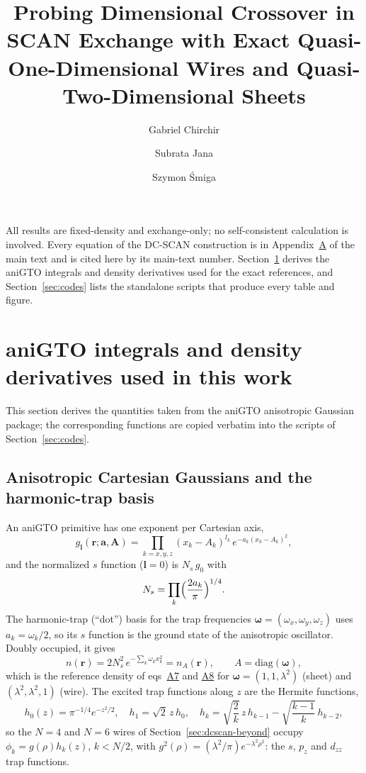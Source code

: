 \documentclass[journal=jctcce,manuscript=suppinfo]{achemso}
\title{Probing Dimensional Crossover in SCAN Exchange with Exact Quasi-One-Dimensional Wires and Quasi-Two-Dimensional Sheets}
\author{Gabriel Chirchir}
\author{Subrata Jana}
\author{Szymon \'Smiga}
\affiliation{Institute of Physics, Faculty of Physics, Astronomy and Informatics,
Nicolaus Copernicus University in Toru\'n, ul.~Grudzi\c{a}dzka~5, 87-100 Toru\'n, Poland}
\begin{document}
All results are fixed-density and exchange-only; no self-consistent
calculation is involved.  Every equation of the DC-SCAN construction is in
Appendix~\href{main.pdf\#section*.6}{A} of the main text and is cited here by its main-text
number.  Section~\ref{sec:anigto-derivation} derives the aniGTO integrals and
density derivatives used for the exact references, and
Section~\ref{sec:codes} lists the standalone scripts that produce every table
and figure.

\section{aniGTO integrals and density derivatives used in this work}
\label{sec:anigto-derivation}
This section derives the quantities taken from the aniGTO anisotropic
Gaussian package\cite{chirchir2026anigto}; the corresponding functions are
copied verbatim into the scripts of Section~\ref{sec:codes}.

\subsection{Anisotropic Cartesian Gaussians and the harmonic-trap basis}
An aniGTO primitive has one exponent per Cartesian axis,
\begin{equation}
g_{\mathbf l}(\mathbf r;\mathbf a,\mathbf A)=\prod_{k=x,y,z}(x_k-A_k)^{l_k}\,e^{-a_k(x_k-A_k)^2},
\label{eq:ani-prim}
\end{equation}
and the normalized $s$ function ($\mathbf l=0$) is $N_s\,g_0$ with
\begin{equation}
N_s=\prod_k\Bigl(\frac{2a_k}{\pi}\Bigr)^{1/4}.
\label{eq:ani-norm}
\end{equation}
The harmonic-trap (``dot'') basis for the trap frequencies
$\boldsymbol\omega=(\omega_x,\omega_y,\omega_z)$ uses $a_k=\omega_k/2$, so its
$s$ function is the ground state of the anisotropic oscillator.  Doubly
occupied, it gives
\begin{equation}
n(\mathbf r)=2N_s^2\,e^{-\sum_k\omega_kx_k^2}=n_A(\mathbf r),\qquad A=\mathrm{diag}(\boldsymbol\omega),
\label{eq:ani-density}
\end{equation}
which is the reference density of eqs~\href{main.pdf\#equation.7}{A7} and
\href{main.pdf\#equation.8}{A8} for $\boldsymbol\omega=(1,1,\lambda^2)$ (sheet) and
$(\lambda^2,\lambda^2,1)$ (wire).  The excited trap functions along $z$ are the
Hermite functions,
\begin{equation}
h_0(z)=\pi^{-1/4}e^{-z^2/2},\quad h_1=\sqrt2\,z\,h_0,\quad
h_k=\sqrt{\frac{2}{k}}\,z\,h_{k-1}-\sqrt{\frac{k-1}{k}}\,h_{k-2},
\label{eq:ani-hermite}
\end{equation}
so the $N=4$ and $N=6$ wires of Section~\ref{sec:dcscan-beyond} occupy
$\phi_k=g(\rho)h_k(z)$, $k<N/2$, with
$g^2(\rho)=(\lambda^2/\pi)e^{-\lambda^2\rho^2}$: the $s$, $p_z$ and $d_{zz}$
trap functions.
\end{document}
